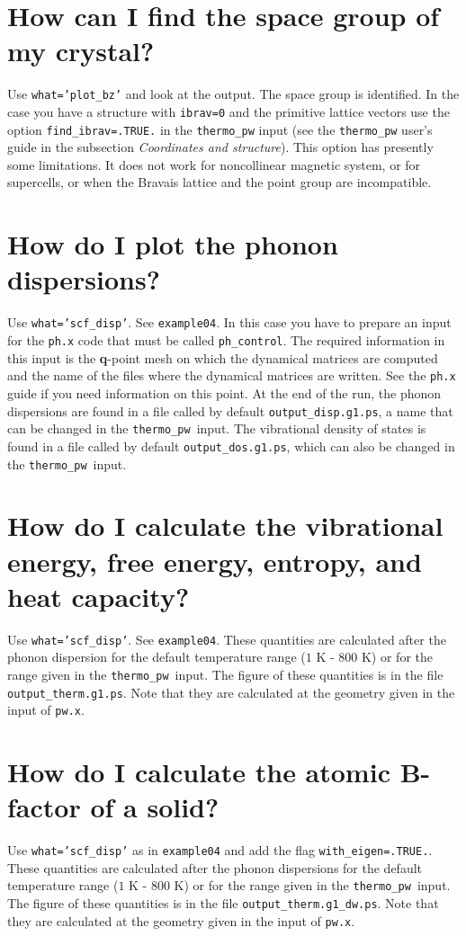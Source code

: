 \documentclass[12pt,a4paper]{article}
\def\thermo{\texttt{thermo\_pw}}
\begin{document}
\newpage
\section{\color{coral}How can I find the space group of my crystal?}
Use \texttt{what='plot\_bz'} and look at the output. The space group is
identified. In the case you have a structure with \texttt{ibrav=0} and
the primitive lattice vectors use the option \texttt{find\_ibrav=.TRUE.} 
in the \texttt{thermo\_pw} input (see the \texttt{thermo\_pw} user's guide 
in the subsection
{\it Coordinates and structure}). This option has presently some limitations.
It does not work for noncollinear magnetic system, or for supercells, or
when the Bravais lattice and the point group are incompatible.

\newpage
\section{\color{coral}How do I plot the phonon dispersions?}
Use \texttt{what='scf\_disp'}. See \texttt{example04}. In this case you
have to prepare an input for the \texttt{ph.x} code that must be
called \texttt{ph\_control}. The required information in this input
is the {\bf q}-point mesh on which the dynamical matrices are computed
and the name of the files where the dynamical matrices are written.
See the \texttt{ph.x} guide if you need information on this point.
At the end of the run, the phonon dispersions are found in a file 
called by default \texttt{output\_disp.g1.ps},
a name that can be changed in the \thermo\ input.
The vibrational density of states is found in a file called by default
\texttt{output\_dos.g1.ps}, which can also be changed in the \thermo\ input.

\newpage
\section{\color{coral}How do I calculate the vibrational energy, 
free energy, entropy, and heat capacity?}
Use \texttt{what='scf\_disp'}. See \texttt{example04}. These quantities
are calculated after the phonon dispersion for the default 
temperature range ($1$ K - $800$ K) or for the range
given in the \thermo\ input. The figure of these quantities is in the file 
\texttt{output\_therm.g1.ps}.
Note that they are calculated at the geometry given in the input
of \texttt{pw.x}.

\newpage
\section{\color{coral}How do I calculate the atomic B-factor of a solid?}
Use \texttt{what='scf\_disp'} as in \texttt{example04} and add the
flag \texttt{with\_eigen=.TRUE.}. These quantities
are calculated after the phonon dispersions for the default 
temperature range ($1$ K - $800$ K) or for the range
given in the \thermo\ input. The figure of these quantities is in the file 
\texttt{output\_therm.g1\_dw.ps}.
Note that they are calculated at the geometry given in the input
of \texttt{pw.x}.
\end{document}
